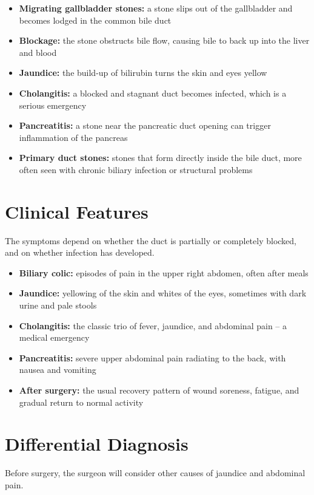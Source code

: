 \begin{itemize}
    \item \textbf{Migrating gallbladder stones:} a stone slips out of the gallbladder and becomes lodged in the common bile duct
    \item \textbf{Blockage:} the stone obstructs bile flow, causing bile to back up into the liver and blood
    \item \textbf{Jaundice:} the build-up of bilirubin turns the skin and eyes yellow
    \item \textbf{Cholangitis:} a blocked and stagnant duct becomes infected, which is a serious emergency
    \item \textbf{Pancreatitis:} a stone near the pancreatic duct opening can trigger inflammation of the pancreas
    \item \textbf{Primary duct stones:} stones that form directly inside the bile duct, more often seen with chronic biliary infection or structural problems
\end{itemize}

\section*{Clinical Features}
The symptoms depend on whether the duct is partially or completely blocked, and on whether infection has developed.

\begin{itemize}
    \item \textbf{Biliary colic:} episodes of pain in the upper right abdomen, often after meals
    \item \textbf{Jaundice:} yellowing of the skin and whites of the eyes, sometimes with dark urine and pale stools
    \item \textbf{Cholangitis:} the classic trio of fever, jaundice, and abdominal pain -- a medical emergency
    \item \textbf{Pancreatitis:} severe upper abdominal pain radiating to the back, with nausea and vomiting
    \item \textbf{After surgery:} the usual recovery pattern of wound soreness, fatigue, and gradual return to normal activity
\end{itemize}

\section*{Differential Diagnosis}
Before surgery, the surgeon will consider other causes of jaundice and abdominal pain.

